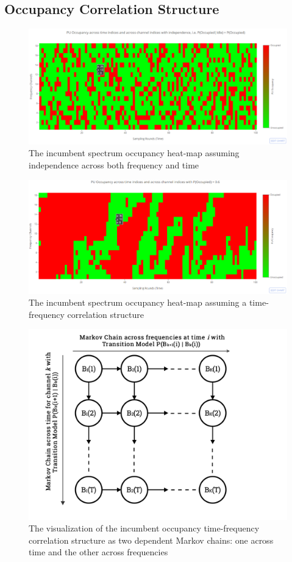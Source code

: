 \subsection{Occupancy Correlation Structure}\label{I.II}
\begin{figure} [htb]
    \centerline{
    \includegraphics[width = 1.0\textwidth]{Independence.PNG}}
    \caption{The incumbent spectrum occupancy heat-map assuming independence across both frequency and time}
    \label{fig:A.1}
\end{figure}
\begin{figure} [htb]
    \centerline{
    \includegraphics[width = 1.0\textwidth]{Space_Time_Corr.PNG}}
    \caption{The incumbent spectrum occupancy heat-map assuming a time-frequency correlation structure}
    \label{fig:A.2}
\end{figure}
\begin{figure} [htb]
    \centerline{
    \includegraphics[width = 1.0\textwidth]{MarkovChainsVisualization.png}}
    \caption{The visualization of the incumbent occupancy time-frequency correlation structure as two dependent Markov chains: one across time and the other across frequencies}
    \label{fig:A.3}
\end{figure}
